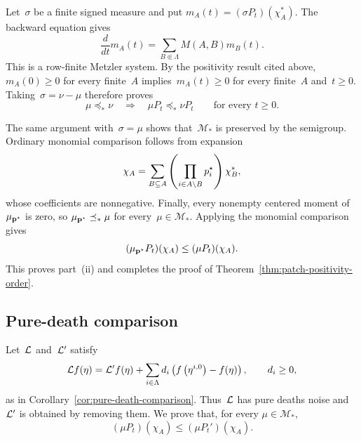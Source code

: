 Let~$\sigma$ be a finite signed measure and put
$m_A(t)=(\sigma P_t)(\chi_A^*)$. The backward equation gives
\begin{equation*}
\frac{d}{dt}m_A(t)
=
\sum_{B\Subset\Lambda}M(A,B)m_B(t).
\end{equation*}
This is a row-finite Metzler system. By the positivity result cited above,
$m_A(0)\geq0$ for every finite~$A$ implies~$m_A(t)\geq0$ for every finite~$A$
and~$t\geq0$. Taking~$\sigma=\nu-\mu$ therefore proves
\begin{equation*}
\mu\preceq_*\nu
\quad\Longrightarrow\quad
\mu P_t\preceq_*\nu P_t
\qquad\text{for every }t\geq0.
\end{equation*}

The same argument with~$\sigma=\mu$ shows that~$\mathcal M_*$ is preserved by
the semigroup. Ordinary monomial comparison follows from expansion
\begin{equation*}
\chi_A
=
\sum_{B\subseteq A}
\left(\prod_{i\in A\setminus B}p_i^\star\right)\chi_B^*,
\end{equation*}
whose coefficients are nonnegative. Finally, every nonempty centered moment of
$\mu_{\mathbf{p}^\star}$ is zero, so
$\mu_{\mathbf{p}^\star}\preceq_*\mu$ for every~$\mu\in\mathcal M_*$. Applying the
monomial comparison gives
\begin{equation*}
(\mu_{\mathbf{p}^\star}P_t)(\chi_A)
\leq
(\mu P_t)(\chi_A).
\end{equation*}
This proves part~\textup{(ii)} and completes the proof of
Theorem~\ref{thm:patch-positivity-order}.

\subsection{Pure-death comparison}
\label{subsec:pure-death-comparison}

Let~$\mathcal{L}$ and~$\mathcal{L}'$ satisfy
\begin{equation*}
\mathcal{L} f(\eta)
=
\mathcal{L}'f(\eta)
+
\sum_{i\in\Lambda}d_i
\left(f\left(\eta^{i,0}\right)-f(\eta)\right),
\qquad d_i\geq0,
\end{equation*}
as in Corollary~\ref{cor:pure-death-comparison}. Thus~$\mathcal{L}$ has
pure deaths noise and~$\mathcal{L}'$ is obtained by removing them. We prove that, for every
$\mu\in\mathcal M_*$,
\begin{equation*}
(\mu P_t)(\chi_A)
\leq
(\mu P_t')(\chi_A).
\end{equation*}

